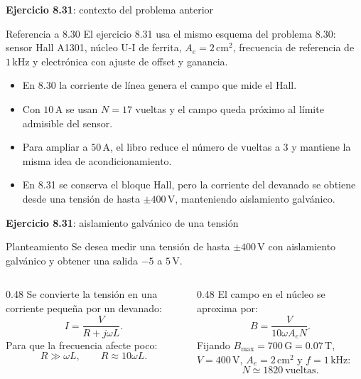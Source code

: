 \documentclass[aspectratio=169,9pt]{beamer}
\newcommand{\exercise}[1]{\textbf{Ejercicio #1}}
\newcommand{\unit}[1]{\,\mathrm{#1}}
\begin{document}
\begin{frame}{\exercise{8.31}: contexto del problema anterior}
  \begin{block}{Referencia a 8.30}
    El ejercicio 8.31 usa el mismo esquema del problema 8.30: sensor Hall A1301, núcleo U-I de ferrita, \(A_e=2\unit{cm^2}\), frecuencia de referencia de \(1\unit{kHz}\) y electrónica con ajuste de offset y ganancia.
  \end{block}

  \begin{itemize}
    \item En 8.30 la corriente de línea genera el campo que mide el Hall.
    \item Con \(10\unit{A}\) se usan \(N=17\) vueltas y el campo queda próximo al límite admisible del sensor.
    \item Para ampliar a \(50\unit{A}\), el libro reduce el número de vueltas a \(3\) y mantiene la misma idea de acondicionamiento.
    \item En 8.31 se conserva el bloque Hall, pero la corriente del devanado se obtiene desde una tensión de hasta \(\pm400\unit{V}\), manteniendo aislamiento galvánico.
  \end{itemize}
\end{frame}

\begin{frame}{\exercise{8.31}: aislamiento galvánico de una tensión}
  \begin{block}{Planteamiento}
    Se desea medir una tensión de hasta \(\pm400\unit{V}\) con aislamiento galvánico y obtener una salida \(-5\) a \(5\unit{V}\).
  \end{block}

  \begin{columns}[T,onlytextwidth]
    \begin{column}{0.48\textwidth}
      Se convierte la tensión en una corriente pequeña por un devanado:
      \[
        I=\frac{V}{R+j\omega L}.
      \]
      Para que la frecuencia afecte poco:
      \[
        R\gg \omega L,
        \qquad R\approx 10\omega L.
      \]
    \end{column}
    \begin{column}{0.48\textwidth}
      El campo en el núcleo se aproxima por:
      \[
        B=\frac{V}{10\omega A_eN}.
      \]
      Fijando \(B_{\max}=700\unit{G}=0.07\unit{T}\),
      \(V=400\unit{V}\), \(A_e=2\unit{cm^2}\) y \(f=1\unit{kHz}\):
      \[
        N\simeq 1820\ \text{vueltas}.
      \]
    \end{column}
  \end{columns}
\end{frame}
\end{document}
